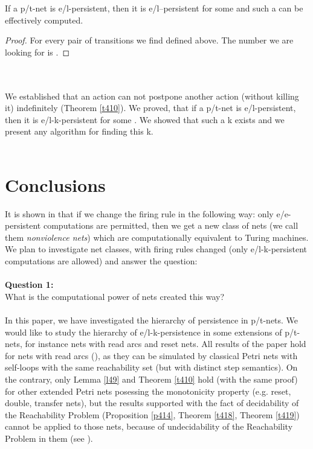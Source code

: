 \documentclass[a4paper]{llncs}
\begin{document}
\begin{theorem}
\label{t420}
If a p/t-net  is e/l-persistent, then it is e/l--persistent for some  and such a  can be effectively computed.
\end{theorem}

\begin{proof}
For every pair  of transitions we find  defined above. The number we are looking for is . 	
\end{proof}
\mbox{ }\\ \\
We established that an action can not postpone another action (without killing it) indefinitely (Theorem \ref{t410}). We proved, that if a p/t-net is e/l-persistent, then it is e/l-k-persistent for some . We showed that such a k exists and we present any algorithm for finding this k. \\ \\

\section{Conclusions}

It is shown in \cite{BarMikOch} that if we change the firing rule in the following way: only e/e-persistent computations are permitted, then we get a new class of nets (we call them \emph{nonviolence nets}) which are computationally equivalent to Turing machines.
We plan to investigate net classes, with firing rules changed (only e/l-k-persistent computations are allowed) and answer the question:
\\ \\
\textbf{Question 1:}\\
What is the computational power of nets created this way?
\\ \\
In this paper, we have investigated the hierarchy of persistence in p/t-nets. We would like to study the hierarchy of e/l-k-persistence in some extensions of p/t-nets, for instance nets with read arcs and reset nets. 
All results of the paper hold for nets with read arcs (\cite{MontanariRossi}), as they can be simulated by classical Petri nets with self-loops with the same reachability set (but with distinct step semantics).
On the contrary, only Lemma \ref{l49} and Theorem \ref{t410} hold (with the same proof) for other extended Petri nets posessing the monotonicity property (e.g. reset, double, transfer nets), but the results supported with the fact of decidability of the Reachability Problem (Proposition \ref{p414}, Theorem \ref{t418}, Theorem \ref{t419}) cannot be applied to those nets, because of undecidability of the Reachability Problem in them (see \cite{Dufourd}).


{}

\end{document}
